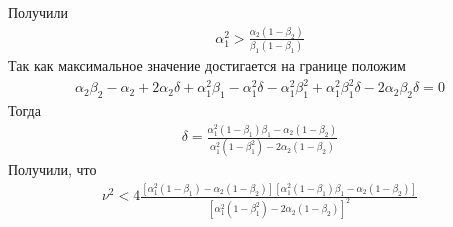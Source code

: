 \documentclass[a4paper,14pt]{extarticle} %
\begin{document}
Получили
 \begin{equation}
 \begin{aligned}
\alpha_1^2 > \frac{\alpha_2(1-\beta_2)}{\beta_1(1-\beta_1)}
 \end{aligned}
\end{equation}
Так как максимальное значение достигается на границе положим 
 \begin{equation}
 \begin{aligned}
\alpha_2\beta_2 - \alpha_2 + 2\alpha_2\delta + \alpha_1^2\beta_1 - \alpha_1^2\delta - \alpha_1^2\beta_1^2 + \alpha_1^2\beta_1^2\delta - 2\alpha_2\beta_2\delta = 0
 \end{aligned}
\end{equation}
Тогда 
 \begin{equation}
 \begin{aligned}
\delta = \frac{\alpha_1^2(1-\beta_1)\beta_1 - \alpha_2(1-\beta_2)}{\alpha_1^2(1-\beta_1^2) - 2\alpha_2(1-\beta_2)}
 \end{aligned}
 \end{equation}
Получили, что
 \begin{equation}
 \begin{aligned}
\nu^2 < 4\frac{[\alpha_1^2(1-\beta_1) - \alpha_2(1-\beta_2)][\alpha_1^2(1-\beta_1)\beta_1 - \alpha_2(1-\beta_2)]}{[\alpha_1^2(1-\beta_1^2) - 2\alpha_2(1-\beta_2)]^2}
 \end{aligned}
 \end{equation}
\end{document}
